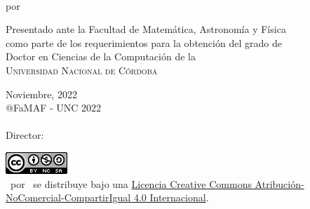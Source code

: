 \begin{titlepage}

\begin{center}
{\LARGE \ThesisTitle}\\ 
\vspace{4mm}
{\Large por \Author}\\

\vspace{50mm}

Presentado ante la Facultad de Matem\'atica, Astronom\'ia y F\'isica\\
como parte de los requerimientos para la obtenci\'on del grado de\\
Doctor en Ciencias de la Computaci\'on de la\\
\textsc{Universidad Nacional de C\'ordoba}\\
 
\vspace{50mm}

Noviembre, 2022\\
@FaMAF - UNC 2022\\
\ \\
{\Large Director: \Supervisor}

\vspace{10mm}
\href{https://licensebuttons.net/l/by-nc-sa/4.0/88x31.png}{\includegraphics{Figs/licencia-famaf.png}}\\
{\ThesisTitle\ por \Author\ se distribuye bajo una \href{https://creativecommons.org/licenses/by-nc-sa/4.0/deed.es_ES}{Licencia Creative Commons Atribución-NoComercial-CompartirIgual 4.0 Internacional}.}
\end{center}  
\end{titlepage} 



